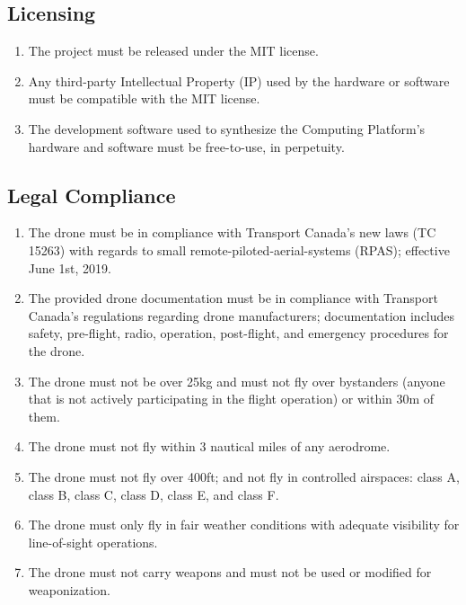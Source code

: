 \documentclass[10pt,letterpaper]{article}
\begin{document}
\subsection{Licensing}
\begin{enumerate}[label=C.LI.\arabic*, wide=1cm, widest=3cm, leftmargin=*, font=\bfseries, noitemsep,topsep=0pt, parsep=4pt, partopsep=0pt]
    \item The project must be released under the MIT license.
    \item Any third-party Intellectual Property (IP) used by the hardware or software must be compatible with the MIT license.
    \item The development software used to synthesize the Computing Platform's hardware and software must be free-to-use, in perpetuity.
\end{enumerate}

\subsection{Legal Compliance}
\begin{enumerate}[label=C.LC.\arabic*, wide=1cm, widest=3cm, leftmargin=*, font=\bfseries, noitemsep,topsep=0pt, parsep=4pt, partopsep=0pt]
    \item The drone must be in compliance with Transport Canada's new laws (TC 15263) with regards to small remote-piloted-aerial-systems (RPAS); effective June 1st, 2019.
    \item The provided drone documentation must be in compliance with Transport Canada's regulations regarding drone manufacturers; documentation includes safety, pre-flight, radio, operation, post-flight, and emergency procedures for the drone.
    \item The drone must not be over 25kg and must not fly over bystanders (anyone that is not actively participating in the flight operation) or within 30m of them.
    \item The drone must not fly within 3 nautical miles of any aerodrome.
    \item The drone must not fly over 400ft; and not fly in controlled airspaces: class A, class B, class C, class D, class E, and class F.
    \item The drone must only fly in fair weather conditions with adequate visibility for line-of-sight operations.
    \item The drone must not carry weapons and must not be used or modified for weaponization.
\end{enumerate}
\end{document}
